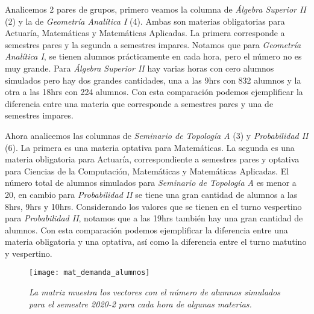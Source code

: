 Analicemos 2 pares de grupos, primero veamos la columna de \textit{Álgebra Superior II} (2) y la de \textit{Geometría Analítica I} (4). Ambas son materias obligatorias para Actuaría, Matemáticas y Matemáticas Aplicadas. La primera corresponde a semestres pares y la segunda a semestres impares. Notamos que para \textit{Geometría Analítica I}, se tienen alumnos prácticamente en cada hora, pero el número no es muy grande. Para \textit{Álgebra Superior II} hay varias horas con cero alumnos simulados pero hay dos grandes cantidades, una a las 9hrs con 832 alumnos y la otra a las 18hrs con 224 alumnos. Con esta comparación podemos ejemplificar la diferencia entre una materia que corresponde a semestres pares y una de semestres impares.

Ahora analicemos las columnas de \textit{Seminario de Topología A} (3) y \textit{Probabilidad II} (6). La primera es una materia optativa para Matemáticas. La segunda es una materia obligatoria para Actuaría, correspondiente a semestres pares y optativa para Ciencias de la Computación, Matemáticas y Matemáticas Aplicadas. El número total de alumnos simulados para \textit{Seminario de Topología A} es menor a 20, en cambio para \textit{Probabilidad II} se tiene una gran cantidad de alumnos a las 8hrs, 9hrs y 10hrs. Considerando los valores que se tienen en el turno vespertino para \textit{Probabilidad II}, notamos que a las 19hrs también hay una gran cantidad de alumnos. Con esta comparación podemos ejemplificar la diferencia entre una materia obligatoria y una optativa, así como la diferencia entre el turno matutino y vespertino.


\begin{figure}[H]
\centering
\texttt{[image: mat\_demanda\_alumnos]} %
\caption[\textit{Ejemplo de matriz con demanda simulada para el 2020-2}]{\textit{La matriz muestra los vectores con el número de alumnos simulados para el semestre 2020-2 para cada hora de algunas materias.}}\label{matDemandaAlum}
\end{figure}
